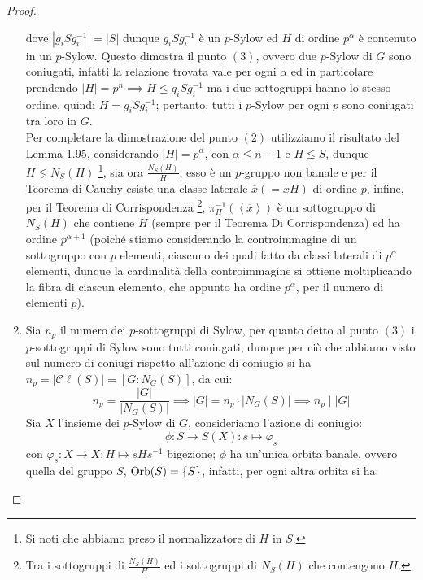 \documentclass[11pt]{scrartcl}
\begin{document}
\begin{proof}
\begin{enumerate}[(1)]
\[                    \]
                dove $|g_iSg_i^{-1}| = |S|$ dunque $g_iSg_i^{-1}$ è un $p$-Sylow ed $H$ di ordine $p^{\alpha}$ è contenuto in un $p$-Sylow. Questo dimostra il punto $(3)$,
                ovvero due $p$-Sylow di $G$ sono coniugati, infatti la relazione trovata vale per ogni $\alpha$ ed in particolare prendendo $|H| = p^n \implies H \leqslant g_iSg_{i}^{-1}$ ma
                i due sottogruppi hanno lo stesso ordine, quindi $H = g_iSg_{i}^{-1}$; pertanto, tutti i $p$-Sylow per ogni $p$ sono coniugati tra loro in $G$. \\
                Per completare la dimostrazione del punto $(2)$ utilizziamo il risultato del \hyperref[l:1.95]{Lemma 1.95}, considerando $|H| = p^{\alpha}$, con $\alpha \leq n - 1$ e $H \lneq S$, dunque $H \lneq N_S(H)$ \footnote{Si noti che abbiamo preso il normalizzatore di $H$ in $S$.},
                sia ora $\frac{N_{S}(H)}{H}$, esso è un $p$-gruppo non banale e per il \hyperref[p:Cauchy]{Teorema di Cauchy} esiste una classe laterale $\overline x (= xH)$ di ordine $p$, infine, per il Teorema di Corrispondenza \footnote{Tra i sottogruppi di $\frac{N_{S}(H)}{H}$ ed i
                sottogruppi di $N_{S}(H)$ che contengono $H$.}, $\pi^{-1}_H(\left<\overline x\right>)$ è un sottogruppo di $N_S(H)$ che contiene $H$ (sempre per il Teorema Di Corrispondenza) ed ha ordine $p^{\alpha+1}$ (poiché stiamo considerando la controimmagine di un sottogruppo con $p$ elementi,
                ciascuno dei quali fatto da classi laterali di $p^{\alpha}$ elementi, dunque la cardinalità della controimmagine si ottiene moltiplicando la fibra di ciascun elemento, che appunto ha ordine $p^{\alpha}$, per il numero di elementi $p$).
            \item Sia $n_p$ il numero dei $p$-sottogruppi di Sylow, per quanto detto al punto $(3)$ i $p$-sottogruppi di Sylow sono tutti coniugati,
            dunque per ciò che abbiamo visto sul numero di coniugi rispetto all'azione di coniugio si ha $n_p = |\mathcal{C}\ell(S)|=[G:N_G(S)]$, da cui:
                        \[ n_p = \frac{|G|}{|N_G(S)|} \implies |G| = n_p \cdot |N_G(S)| \implies n_p \mid |G|
                            \]
                Sia $X$ l'insieme dei $p$-Sylow di $G$, consideriamo l'azione di coniugio:
                    \[ \phi : S \longrightarrow S(X) : s \longmapsto \varphi_s
                        \]
                con $\varphi_s : X \longrightarrow X : H \longmapsto sHs^{-1}$ bigezione; $\phi$ ha un'unica orbita banale, ovvero quella del gruppo $S$, $\operatorname{Orb}(S) = \{S\}$, infatti, per ogni altra orbita si ha:

\end{enumerate}
\end{proof}
\end{document}
